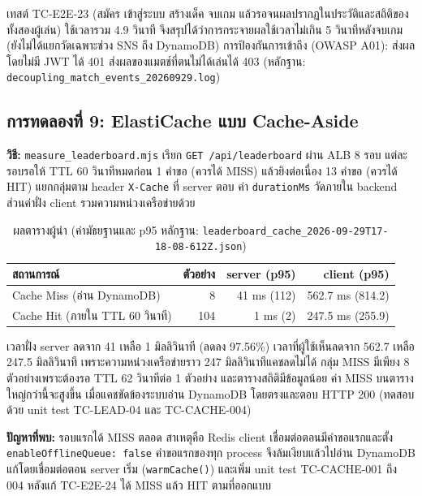 เทสต์ TC-E2E-23 (สมัคร เข้าสู่ระบบ สร้างเด็ค จบเกม แล้วรอจนผลปรากฏในประวัติและสถิติของทั้งสองผู้เล่น) ใช้เวลารวม 4.9 วินาที จึงสรุปได้ว่าการกระจายผลใช้เวลาไม่เกิน 5 วินาทีหลังจบเกม (ยังไม่ได้แยกวัดเฉพาะช่วง SNS ถึง DynamoDB) การป้องกันการเข้าถึง (OWASP A01): ส่งผลโดยไม่มี JWT ได้ 401 ส่งผลของแมตช์ที่ตนไม่ได้เล่นได้ 403 (หลักฐาน: \texttt{decoupling\_match\_events\_20260929.log})

\subsection{การทดลองที่ 9: ElastiCache แบบ Cache-Aside}

\textbf{วิธี:} \texttt{measure\_leaderboard.mjs} เรียก \texttt{GET /api/leaderboard} ผ่าน ALB 8 รอบ แต่ละรอบรอให้ TTL 60 วินาทีหมดก่อน 1 คำขอ (ควรได้ MISS) แล้วยิงต่อเนื่อง 13 คำขอ (ควรได้ HIT) แยกกลุ่มตาม header \texttt{X-Cache} ที่ server ตอบ ค่า \texttt{durationMs} วัดภายใน backend ส่วนค่าฝั่ง client รวมความหน่วงเครือข่ายด้วย

\begin{table}[H]
\centering
\caption{ผลตารางผู้นำ (ค่ามัธยฐานและ p95 หลักฐาน: \nolinkurl{leaderboard_cache_2026-09-29T17-18-08-612Z.json})}
\begin{tabularx}{\textwidth}{Xrrr}
\toprule
\textbf{สถานการณ์} & \textbf{ตัวอย่าง} & \textbf{server (p95)} & \textbf{client (p95)} \\
\midrule
Cache Miss (อ่าน DynamoDB) & 8 & 41 ms (112) & 562.7 ms (814.2) \\
Cache Hit (ภายใน TTL 60 วินาที) & 104 & 1 ms (2) & 247.5 ms (255.9) \\
\bottomrule
\end{tabularx}
\end{table}

เวลาฝั่ง server ลดจาก 41 เหลือ 1 มิลลิวินาที (ลดลง 97.56\%) เวลาที่ผู้ใช้เห็นลดจาก 562.7 เหลือ 247.5 มิลลิวินาที เพราะความหน่วงเครือข่ายราว 247 มิลลิวินาทีแคชลดไม่ได้ กลุ่ม MISS มีเพียง 8 ตัวอย่างเพราะต้องรอ TTL 62 วินาทีต่อ 1 ตัวอย่าง และตารางสถิติมีข้อมูลน้อย ค่า MISS บนตารางใหญ่กว่านี้จะสูงขึ้น เมื่อแคชขัดข้องระบบอ่าน DynamoDB โดยตรงและตอบ HTTP 200 (ทดสอบด้วย unit test TC-LEAD-04 และ TC-CACHE-004)

\textbf{ปัญหาที่พบ:} รอบแรกได้ MISS ตลอด สาเหตุคือ Redis client เชื่อมต่อตอนมีคำขอแรกและตั้ง \texttt{enableOfflineQueue: false} คำขอแรกของทุก process จึงล้มเงียบแล้วไปอ่าน DynamoDB แก้โดยเชื่อมต่อตอน server เริ่ม (\texttt{warmCache()}) และเพิ่ม unit test TC-CACHE-001 ถึง 004 หลังแก้ TC-E2E-24 ได้ MISS แล้ว HIT ตามที่ออกแบบ


